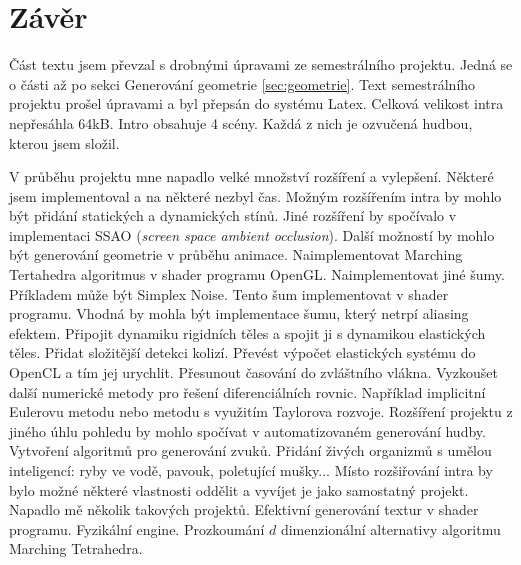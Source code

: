 
\chapter{Závěr}
Část textu jsem převzal s drobnými úpravami ze semestrálního projektu.
Jedná se o části až po sekci Generování geometrie \ref{sec:geometrie}.
Text semestrálního projektu prošel úpravami a byl přepsán do systému Latex.
Celková velikost intra nepřesáhla 64kB.
Intro obsahuje 4 scény.
Každá z nich je ozvučená hudbou, kterou jsem složil.

V průběhu projektu mne napadlo velké množství rozšíření a vylepšení.
Některé jsem implementoval a na některé nezbyl čas.
Možným rozšířením intra by mohlo být přidání statických a dynamických stínů.
Jiné rozšíření by spočívalo v implementaci SSAO ({\it screen space ambient occlusion}).
Další možností by mohlo být generování geometrie v průběhu animace.
Naimplementovat Marching Tertahedra algoritmus v shader programu OpenGL.
Naimplementovat jiné šumy.
Příkladem může být Simplex Noise.
Tento šum implementovat v shader programu.
Vhodná by mohla být implementace šumu, který netrpí aliasing efektem.
Připojit dynamiku rigidních těles a spojit ji s dynamikou elastických těles.
Přidat složitější detekci kolizí.
Převést výpočet elastických systému do OpenCL a tím jej urychlit.
Přesunout časování do zvláštního vlákna.
Vyzkoušet další numerické metody pro řešení diferenciálních rovnic.
Například implicitní Eulerovu metodu nebo metodu s využitím Taylorova rozvoje.
Rozšíření projektu z jiného úhlu pohledu by mohlo spočívat v au\-to\-ma\-ti\-zo\-va\-ném generování hudby.
Vytvoření algoritmů pro generování zvuků.
Přidání živých organizmů s umělou inteligencí: ryby ve vodě, pavouk, poletující mušky...
Místo rozšiřování intra by bylo možné některé vlastnosti oddělit a vyvíjet je jako samostatný projekt.
Napadlo mě několik takových projektů.
Efektivní generování textur v shader programu.
Fyzikální engine.
Prozkoumání $d$ dimenzionální alternativy algoritmu Marching Tetrahedra.

